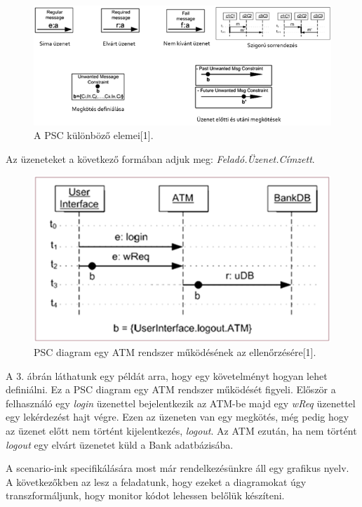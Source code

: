 \begin{figure}[!ht]
    \centering
    \includegraphics[width=150mm, keepaspectratio]{figures/2abra.png}
    \caption{A PSC különböző elemei[1].}
\end{figure}

Az üzeneteket a következő formában adjuk meg: \textit{Feladó.Üzenet.Címzett}.

\begin{figure}[!ht]
    \centering
    \includegraphics[width=150mm, keepaspectratio]{figures/3abra.png}
    \caption{PSC diagram egy ATM rendszer működésének az ellenőrzésére[1].}
\end{figure}
A 3. ábrán láthatunk egy példát arra, hogy egy követelményt hogyan lehet definiálni. Ez a PSC diagram egy ATM rendszer működését figyeli. Először a felhasználó egy \textit{login} üzenettel bejelentkezik az ATM-be majd egy \textit{wReq} üzenettel egy lekérdezést hajt végre. Ezen az üzeneten van egy megkötés, még pedig hogy az üzenet előtt nem történt kijelentkezés, \textit{logout}. Az ATM ezután, ha nem történt \textit{logout} egy elvárt üzenetet küld a Bank adatbázisába.

A scenario-ink specifikálására most már rendelkezésünkre áll egy grafikus nyelv. A következőkben az lesz a feladatunk, hogy ezeket a diagramokat úgy transzformáljunk, hogy monitor kódot lehessen belőlük készíteni.

